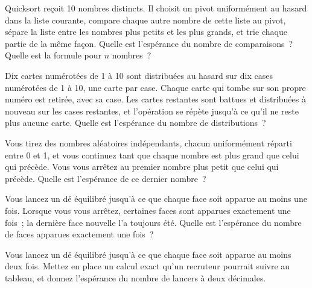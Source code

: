 \begin{question}\label{iq:iv1:expectation-and-indicators:21}
Quicksort reçoit 10 nombres distincts. Il choisit un pivot uniformément au hasard dans la liste courante, compare chaque
autre nombre de cette liste au pivot, sépare la liste entre les nombres plus petits et les plus grands, et trie chaque
partie de la même façon. Quelle est l'espérance du nombre de comparaisons~? Quelle est la formule pour $n$ nombres~?
\end{question}

\begin{question}\label{iq:iv1:expectation-and-indicators:22}
Dix cartes numérotées de 1 à 10 sont distribuées au hasard sur dix cases numérotées de 1 à 10, une carte par case. Chaque carte
qui tombe sur son propre numéro est retirée, avec sa case. Les cartes restantes sont battues et distribuées à nouveau
sur les cases restantes, et l'opération se répète jusqu'à ce qu'il ne reste plus aucune carte. Quelle est l'espérance du nombre de distributions~?
\end{question}

\begin{question}\label{iq:iv1:expectation-and-indicators:23}
Vous tirez des nombres aléatoires indépendants, chacun uniformément réparti entre 0 et 1, et vous continuez tant que chaque nombre est
plus grand que celui qui précède. Vous vous arrêtez au premier nombre plus petit que celui qui précède. Quelle est l'espérance
de ce dernier nombre~?
\end{question}

\begin{question}\label{iq:iv1:expectation-and-indicators:24}
Vous lancez un dé équilibré jusqu'à ce que chaque face soit apparue au moins une fois. Lorsque vous vous arrêtez, certaines faces sont
apparues exactement une fois~; la dernière face nouvelle l'a toujours été. Quelle est l'espérance du nombre de faces apparues exactement une fois~?
\end{question}

\begin{question}\label{iq:iv1:expectation-and-indicators:25}
Vous lancez un dé équilibré jusqu'à ce que chaque face soit apparue au moins deux fois. Mettez en place un calcul exact qu'un recruteur
pourrait suivre au tableau, et donnez l'espérance du nombre de lancers à deux décimales.
\end{question}
